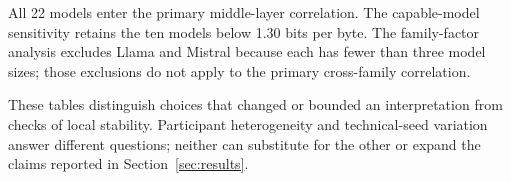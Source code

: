 All 22 models enter the primary middle-layer correlation.
The capable-model sensitivity retains the ten models below 1.30 bits per byte.
The family-factor analysis excludes Llama and Mistral because each has fewer than three model sizes; those exclusions do not apply to the primary cross-family correlation.

These tables distinguish choices that changed or bounded an interpretation from checks of local stability.
Participant heterogeneity and technical-seed variation answer different questions; neither can substitute for the other or expand the claims reported in Section~\ref{sec:results}.
